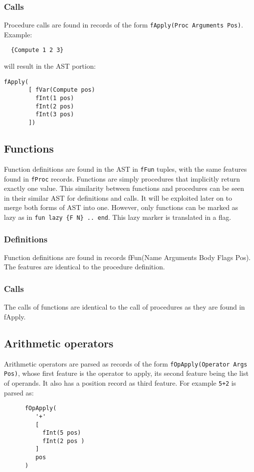 \documentclass[a4paper]{memoir}
\begin{document}
\subsubsection{Calls}
Procedure calls are found in records of the form 
\lstinline!fApply(Proc Arguments Pos)!. 
Example:

\begin{lstlisting}
  {Compute 1 2 3}
\end{lstlisting}

will result in the AST portion:
\begin{lstlisting}
fApply(
       [ fVar(Compute pos)
         fInt(1 pos)
         fInt(2 pos)
         fInt(3 pos)
       ])
\end{lstlisting}

\subsection{Functions}\label{sec:input:functions}
Function definitions are found in the AST in \lstinline!fFun! tuples, with the
same features found in \lstinline!fProc! records. Functions are simply
procedures that implicitly return exactly one value. This similarity between
functions and procedures can be seen in their similar AST for definitions and
calls. It will be exploited later on to merge both forms of AST
into one.
However, only functions can be marked as lazy as in \lstinline!fun lazy {F N} .. end!. This lazy marker is translated in a flag.
\subsubsection{Definitions}
Function definitions are found in records fFun(Name Arguments Body Flags Pos). The features are identical to the procedure definition.
\subsubsection{Calls}
The calls of functions are identical to the call of procedures as they are found in fApply.

\subsection{Arithmetic operators}\label{sec:input:operators}
Arithmetic operators are parsed as records of the form
\lstinline!fOpApply(Operator Args Pos)!, whose first feature is the operator to
apply, its second feature being the list of operands. It also has a position
record as third feature. For example
\lstinline!5+2! is parsed as:
\begin{lstlisting}
      fOpApply(
         '+'
         [
           fInt(5 pos)
           fInt(2 pos )
         ]
         pos
      )
\end{lstlisting}
\end{document}
